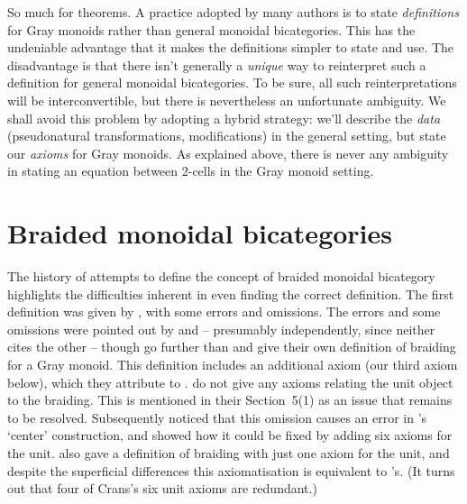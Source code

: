 \documentclass{robinthesisdraft}
\begin{document}
So much for theorems. A practice adopted by many authors
\citep[e.g.][]{MonBicat,HDA1} is to state \emph{definitions} for
Gray monoids rather than general monoidal bicategories. This has
the undeniable advantage that it makes the definitions simpler
to state and use. The disadvantage is that there isn't generally a \emph{unique}
way to reinterpret such a definition for general monoidal bicategories.
To be sure, all such reinterpretations will be interconvertible, but
there is nevertheless an unfortunate ambiguity. We shall avoid this
problem by adopting a hybrid strategy: we'll describe the \emph{data}
(pseudonatural transformations, modifications) in the general setting,
but state our \emph{axioms} for Gray monoids. As explained above, there is
never any ambiguity in stating an equation between 2-cells in the Gray monoid
setting.

\section{Braided monoidal bicategories}\label{s-braiding}
The history of attempts to define the concept of braided monoidal bicategory highlights
the difficulties inherent in even finding the correct definition. The
first definition was given by \citet{KV}, with some errors and omissions.
The errors and some omissions were pointed out by \citet{CarmodyThesis}
and \citet{HDA1} -- presumably independently, since neither cites the
other -- though \citeauthor{HDA1} go further than \citeauthor{CarmodyThesis}
and give their own definition of braiding for a Gray monoid. This
definition includes an additional axiom (our third axiom below), which they
attribute to \citet{Breen-ator}.
%
 do not give any axioms relating the unit object to the
braiding. This is mentioned in their Section~5(1) as an issue that
remains to be resolved. Subsequently \citet{GeneralizedCenters}
noticed that this omission causes an error in \citeauthor{HDA1}'s
`center' construction, and showed how it could be fixed by adding
six axioms for the unit.  also gave a definition of
braiding with just one axiom for the unit, and despite the superficial
differences this axiomatisation is equivalent to
\citeauthor{GeneralizedCenters}'s. (It turns out that four of Crans's
six unit axioms are redundant.)
\end{document}
